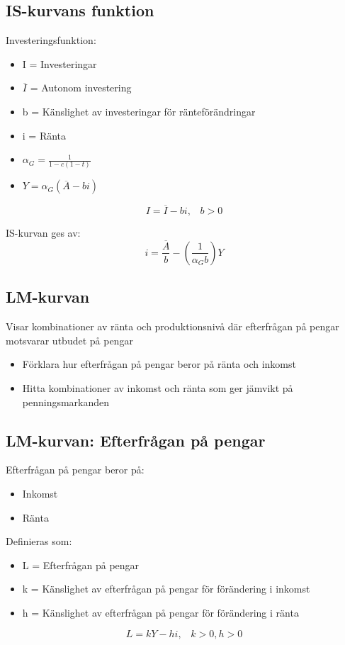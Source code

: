 \documentclass[12pt,a4paper]{article}
\begin{document}
\subsection*{IS-kurvans funktion}
Investeringsfunktion:
\begin{itemize}
    \item I = Investeringar
    \item $\overline{I}$ = Autonom investering
    \item b = Känslighet av investeringar för ränteförändringar
    \item i = Ränta
    \item $\alpha_G = \frac{1}{1-c(1-t)}$
    \item $Y = \alpha_G (\overline{A} - bi)$
\end{itemize}
$$I = \overline{I} - bi, \hspace{10pt} b > 0$$

\noindent IS-kurvan ges av:
$$i = \frac{\overline{A}}{b} - (\frac{1}{\alpha_G b})Y$$

\subsection*{LM-kurvan}
Visar kombinationer av ränta och produktionsnivå där efterfrågan på pengar motsvarar utbudet på pengar
\begin{itemize}
    \item Förklara hur efterfrågan på pengar beror på ränta och inkomst
    \item Hitta kombinationer av inkomst och ränta som ger jämvikt på penningsmarkanden
\end{itemize}

\subsection*{LM-kurvan: Efterfrågan på pengar}
Efterfrågan på pengar beror på:
\begin{itemize}
    \item Inkomst
    \item Ränta
\end{itemize}

\noindent Definieras som:
\begin{itemize}
    \item L = Efterfrågan på pengar
    \item k = Känslighet av efterfrågan på pengar för förändering i inkomst
    \item h = Känslighet av efterfrågan på pengar för förändering i ränta
\end{itemize}
$$L = kY - hi, \hspace{10pt} k > 0, h > 0$$
\end{document}
